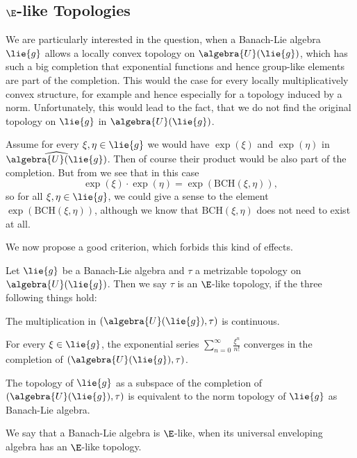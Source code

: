 \documentclass[
11pt,                          %
english                        %
]{article}
\newcommand{\bch}[2]{\mathrm{BCH}\left(#1, #2\right)}
\begin{document}
\subsection{$\E$-like Topologies}
We are particularly interested in the question, when a Banach-Lie algebra $\lie{g}$ allows a locally convex topology on $\algebra{U}(\lie{g})$, which has such a big completion that exponential functions and hence group-like elements are part of the completion. This would the case for every locally multiplicatively convex structure, for example and hence especially for a topology induced by a norm. Unfortunately, this would lead to the fact, that we do not find the original topology on $\lie{g}$ in $\algebra{U}(\lie{g})$.
\begin{remark}
	\label{Rem:BCHDesaster}
	Assume for every $\xi, \eta \in \lie{g}$ we would have $\exp(\xi)$ and 
	$\exp(\eta)$ in $\widehat{\algebra{U}(\lie{g})}$. Then of course their product 
	would be also part of the completion. But from 
	\cite{esposito.stapor.waldmann:2015a:pre} we see that in this case
	\begin{equation*}
		\exp(\xi) \cdot \exp(\eta)
		=
		\exp\left(
			\bch{\xi}{\eta}
		\right),
	\end{equation*}
	so for all $\xi, \eta \in \lie{g}$, we could give a sense to the element 
	$\exp\left( \bch{\xi}{\eta} \right)$, although we know that $\bch{\xi}{\eta}$ 
	does not need to exist at all. 
\end{remark}
We now propose a good criterion, which forbids this kind of effects.
\begin{definition}
	Let $\lie{g}$ be a Banach-Lie algebra and $\tau$ a metrizable topology on 
	$\algebra{U}(\lie{g})$. Then we say $\tau$ is an $\E$-like topology, if the 
	three following things hold:
	\begin{definitionlist}
		\item
		The multiplication in $(\algebra{U}(\lie{g}), \tau)$ is continuous.
		
		\item
		For every $\xi \in \lie{g}$, the exponential series $\sum_{n=0}^\infty 
		\frac{\xi^n}{n!}$ converges in the completion of $(\algebra{U}(\lie{g}), 
		\tau)$.
		
		\item
		The topology of $\lie{g}$ as a subspace of  the completion of $(\algebra{U}
		(\lie{g}), \tau)$ is equivalent to the norm topology of $\lie{g}$ as 
		Banach-Lie algebra.
	\end{definitionlist}
	We say that a Banach-Lie algebra is $\E$-like, when its universal enveloping 
	algebra has an $\E$-like topology.
\end{definition}
\end{document}
